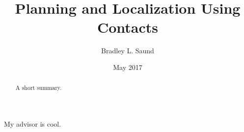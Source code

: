 \documentclass[12pt]{cmuthesis}
\begin{document}
 
\frontmatter

\pagestyle{empty}

\title{ %
{\bf Planning and Localization Using Contacts}}
\author{Bradley L. Saund}
\date{May 2017}
\trnumber{}


\support{}
\disclaimer{}


\keywords{}

\maketitle

\begin{dedication}

\end{dedication}

\pagestyle{plain} %


\begin{abstract}
A short summary.
\end{abstract}

\begin{acknowledgments}
My advisor is cool.
\end{acknowledgments}



\tableofcontents
\listoffigures
\listoftables

\mainmatter


%
%
%
%
%
\end{document}
